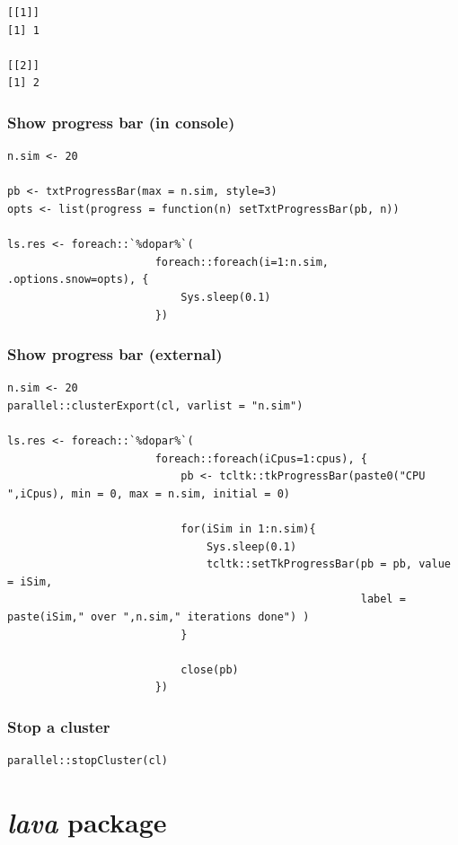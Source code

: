 \documentclass{article}
\begin{document}
\begin{verbatim}
[[1]]
[1] 1

[[2]]
[1] 2
\end{verbatim}

\subsubsection{Show progress bar (in console)}
\label{sec:org0137ea3}

\lstset{language=r,label= ,caption= ,captionpos=b,numbers=none}
\begin{lstlisting}
n.sim <- 20

pb <- txtProgressBar(max = n.sim, style=3)
opts <- list(progress = function(n) setTxtProgressBar(pb, n))

ls.res <- foreach::`%dopar%`(
					   foreach::foreach(i=1:n.sim, .options.snow=opts), {
						   Sys.sleep(0.1)
					   })
\end{lstlisting}

\subsubsection{Show progress bar (external)}
\label{sec:orgd557bdc}

\lstset{language=r,label= ,caption= ,captionpos=b,numbers=none}
\begin{lstlisting}
n.sim <- 20
parallel::clusterExport(cl, varlist = "n.sim")

ls.res <- foreach::`%dopar%`(
					   foreach::foreach(iCpus=1:cpus), {
						   pb <- tcltk::tkProgressBar(paste0("CPU ",iCpus), min = 0, max = n.sim, initial = 0)

						   for(iSim in 1:n.sim){
							   Sys.sleep(0.1)
							   tcltk::setTkProgressBar(pb = pb, value = iSim,
													   label = paste(iSim," over ",n.sim," iterations done") )
						   }

						   close(pb)
					   })
\end{lstlisting}

\subsubsection{Stop a cluster}
\label{sec:org7d795b3}

\lstset{language=r,label= ,caption= ,captionpos=b,numbers=none}
\begin{lstlisting}
parallel::stopCluster(cl)
\end{lstlisting}

\section{\emph{lava} package}
\label{sec:org96f4b8d}
\end{document}
